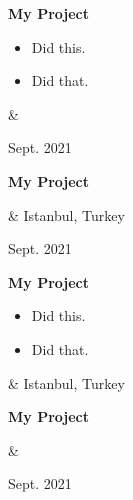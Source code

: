 \documentclass[10pt, letterpaper]{article}
\newenvironment{highlights}{
        \begin{itemize}[
                topsep=0pt,
                parsep=0.10 cm,
                partopsep=0pt,
                itemsep=0pt,
                after=\relax,
                leftmargin=0.4 cm + 3pt
            ]
    }{
        \end{itemize}
    } %
\let\originalTabularx\tabularx
\let\originalEndTabularx\endtabularx
\renewenvironment{tabularx}{\bgroup\centering\originalTabularx}{\originalEndTabularx\par\egroup}
\begin{document}
        \vspace{0.2 cm}
        \begin{tabularx}{
            \textwidth-0.4 cm-0.13cm
        }{
            K{0.2 cm}
            R{4.1 cm}
        }
            \textbf{My Project}

            \vspace{0.10 cm}

            \begin{highlights}
                \item Did this.
                \item Did that.
            \end{highlights}
            &
            

            Sept. 2021
        \end{tabularx}


        \vspace{0.2 cm}
        \begin{tabularx}{
            \textwidth-0.4 cm-0.13cm
        }{
            K{0.2 cm}
            R{4.1 cm}
        }
            \textbf{My Project}

            \vspace{0.10 cm}

            &
            Istanbul, Turkey

            Sept. 2021
        \end{tabularx}


        \vspace{0.2 cm}
        \begin{tabularx}{
            \textwidth-0.4 cm-0.13cm
        }{
            K{0.2 cm}
            R{4.1 cm}
        }
            \textbf{My Project}

            \vspace{0.10 cm}

            \begin{highlights}
                \item Did this.
                \item Did that.
            \end{highlights}
            &
            Istanbul, Turkey

            
        \end{tabularx}


        \vspace{0.2 cm}
        \begin{tabularx}{
            \textwidth-0.4 cm-0.13cm
        }{
            K{0.2 cm}
            R{4.1 cm}
        }
            \textbf{My Project}

            \vspace{0.10 cm}

            &
            

            Sept. 2021
        \end{tabularx}
\end{document}
